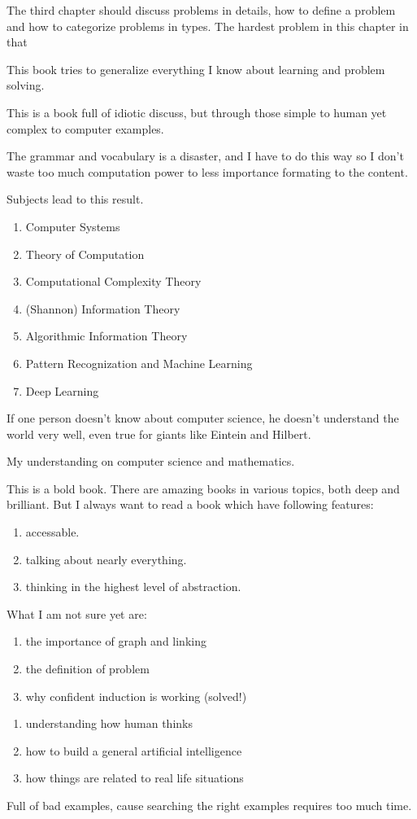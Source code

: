 The third chapter should discuss problems in details, how to define a problem and how to categorize problems in types. The hardest problem in this chapter in that

This book tries to generalize everything I know about learning and problem solving.

This is a book full of idiotic discuss, but through those simple to human yet complex to computer examples.

The grammar and vocabulary is a disaster, and I have to do this way so I don't waste too much computation power to less importance formating to the content.

Subjects lead to this result.

\begin{enumerate}
  \item Computer Systems
  \item Theory of Computation
  \item Computational Complexity Theory
  \item (Shannon) Information Theory
  \item Algorithmic Information Theory
  \item Pattern Recognization and Machine Learning
  \item Deep Learning
\end{enumerate}

If one person doesn't know about computer science, he doesn't understand the world very well, even true for giants like Eintein and Hilbert.

My understanding on computer science and mathematics.

This is a bold book. There are amazing books in various topics, both deep and brilliant. But I always want to read a book which have following features:

\begin{enumerate}
  \item accessable.
  \item talking about nearly everything.
  \item thinking in the highest level of abstraction.
\end{enumerate}

What I am not sure yet are:

\begin{enumerate}
  \item the importance of graph and linking
  \item the definition of problem
  \item why confident induction is working (solved!)
\end{enumerate}

\begin{enumerate}
  \item understanding how human thinks
  \item how to build a general artificial intelligence
  \item how things are related to real life situations
\end{enumerate}

Full of bad examples, cause searching the right examples requires too much time.

